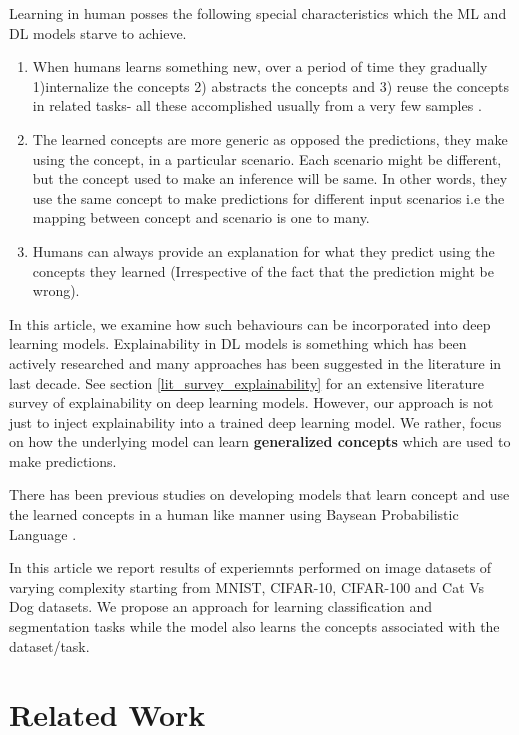 \documentclass{JMLFS}
\begin{document}
Learning in human posses the following special characteristics which the ML and DL models starve to achieve.
\begin{enumerate}

\item When humans learns something new, over a period of time they gradually  1)internalize the concepts 2) abstracts the concepts and 3) reuse the concepts in related tasks- all these accomplished usually from a very few samples \cite{lake2015}.

\item The learned concepts are more generic as opposed the predictions, they make using the concept, in a particular scenario.
Each scenario might be different, but the concept used to make an inference will be same.
In other words, they use the same concept to make predictions for different input scenarios i.e the mapping between concept and scenario is one to many.

\item Humans can always provide an explanation for what they predict using the concepts they learned (Irrespective of the fact that the prediction might be wrong).

\end{enumerate}
In this article, we examine how such behaviours can be incorporated into deep learning models.
Explainability in DL models is something which has been actively researched and many approaches has been suggested in the literature in last decade\cite{linardatos2021}.
See section \ref{lit_survey_explainability} for an extensive literature survey of explainability on deep learning models.
However, our approach is not just to inject explainability into a trained deep learning model.
We rather, focus on how the underlying model can learn \textbf{generalized concepts}  which are used to make predictions.


There has been previous studies \cite{mr01} on developing models that learn concept and use the learned concepts in a human like manner using Baysean Probabilistic Language \cite{}.

In this article we report results of experiemnts performed on image datasets of varying complexity starting from MNIST, CIFAR-10, CIFAR-100 and Cat Vs Dog datasets.
We propose an approach for learning classification and segmentation tasks while the model also learns the concepts associated with the dataset/task.

\section{Related Work}
\end{document}
